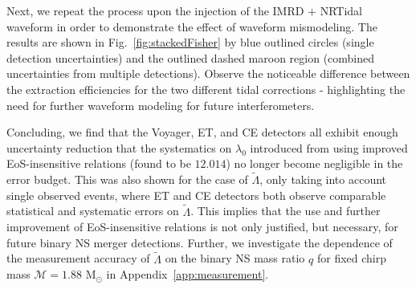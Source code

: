 \documentclass[prd,twocolumn,nofootinbib,superscriptaddress,amsmath,amssymb]{revtex4-1}
\begin{document}
Next, we repeat the process upon the injection of the IMRD + NRTidal waveform in order to demonstrate the effect of waveform mismodeling.
The results are shown in Fig.~\ref{fig:stackedFisher} by blue outlined circles (single detection uncertainties) and the outlined dashed maroon region (combined uncertainties from multiple detections).
Observe the noticeable difference between the extraction efficiencies for the two different tidal corrections - highlighting the need for further waveform modeling for future interferometers.

Concluding, we find that the Voyager, ET, and CE detectors all exhibit enough uncertainty reduction that the systematics on $\lambda_0$ introduced from using improved EoS-insensitive relations (found to be $12.014$) no longer become negligible in the error budget.
This was also shown for the case of $\tilde\Lambda$, only taking into account single observed events, where ET and CE detectors both observe comparable statistical and systematic errors on $\tilde\Lambda$.
This implies that the use and further improvement of EoS-insensitive relations is not only justified, but necessary, for future binary NS merger detections.
Further, we investigate the dependence of the measurement accuracy of $\tilde\Lambda$ on the binary NS mass ratio $q$ for fixed chirp mass $\mathcal{M}=1.88\text{ M}_{\odot}$ in Appendix~\ref{app:measurement}.

\end{document}
